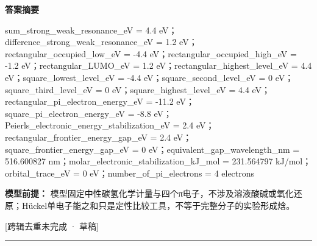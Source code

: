 \documentclass[UTF8,11pt,a4paper]{ctexart}
\begin{document}
\noindent\textbf{答案摘要}\par
sum\_strong\_weak\_resonance\_eV = 4.4 eV；difference\_strong\_weak\_resonance\_eV = 1.2 eV；rectangular\_occupied\_low\_eV = -4.4 eV；rectangular\_occupied\_high\_eV = -1.2 eV；rectangular\_LUMO\_eV = 1.2 eV；rectangular\_highest\_level\_eV = 4.4 eV；square\_lowest\_level\_eV = -4.4 eV；square\_second\_level\_eV = 0 eV；square\_third\_level\_eV = 0 eV；square\_highest\_level\_eV = 4.4 eV；rectangular\_pi\_electron\_energy\_eV = -11.2 eV；square\_pi\_electron\_energy\_eV = -8.8 eV；Peierls\_electronic\_energy\_stabilization\_eV = 2.4 eV；rectangular\_frontier\_energy\_gap\_eV = 2.4 eV；square\_frontier\_energy\_gap\_eV = 0 eV；equivalent\_gap\_wavelength\_nm = 516.600827 nm；molar\_electronic\_stabilization\_kJ\_mol = 231.564797 kJ/mol；orbital\_trace\_eV = 0 eV；number\_of\_pi\_electrons = 4 electrons\par
\noindent\textbf{模型前提：}
模型固定中性碳氢化学计量与四个π电子，不涉及溶液酸碱或氧化还原；Hückel单电子能之和只是定性比较工具，不等于完整分子的实验形成焓。\par
\noindent\textcolor{red!65!black}{[跨辑去重未完成 · 草稿]} \par
\medskip\hrule\medskip
{}
\end{document}
